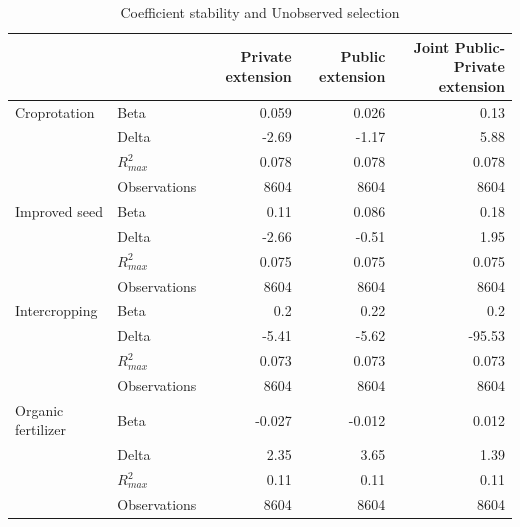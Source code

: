 \documentclass[
]{article}
\begin{document}
\newpage

\begin{table}[htbp]
\caption{Coefficient stability and Unobserved selection}
\begin{tabular}{@{}llrrr@{}}
\toprule
                   &              & Private extension & Public extension & Joint Public-Private extension \\ \midrule
Croprotation       & Beta         & 0.059          & 0.026            & 0.13                           \\
                   & Delta        & -2.69             & -1.17            & 5.88                           \\
                   & $R^2_{max}$      & 0.078             & 0.078            & 0.078                          \\
                   & Observations & 8604              & 8604             & 8604                           \\ \midrule
Improved seed      & Beta         & 0.11              & 0.086            & 0.18                           \\
                   & Delta        & -2.66             & -0.51            & 1.95                           \\
                   & $R^2_{max}$      & 0.075             & 0.075            & 0.075                          \\
                   & Observations & 8604              & 8604             & 8604                           \\ \midrule
Intercropping      & Beta         & 0.2               & 0.22             & 0.2                            \\
                   & Delta        & -5.41             & -5.62            & -95.53                         \\
                   & $R^2_{max}$      & 0.073             & 0.073            & 0.073                          \\
                   & Observations & 8604              & 8604             & 8604                           \\ \midrule
Organic fertilizer & Beta         & -0.027            & -0.012           & 0.012                          \\
                   & Delta        & 2.35              & 3.65             & 1.39                           \\
                   & $R^2_{max}$      & 0.11              & 0.11             & 0.11                           \\
                   & Observations & 8604              & 8604             & 8604                           \\ \bottomrule
\end{tabular}
\end{table}
\end{document}
